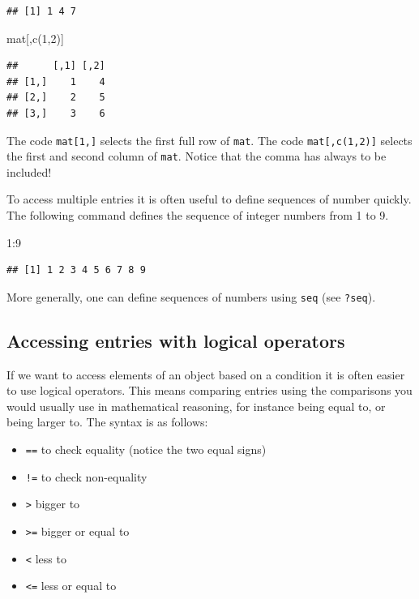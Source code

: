 \documentclass[
]{book}
\newenvironment{Shaded}{\begin{snugshade}}{\end{snugshade}}
\newcommand{\DecValTok}[1]{\textcolor[rgb]{0.00,0.00,0.81}{#1}}
\newcommand{\FunctionTok}[1]{\textcolor[rgb]{0.00,0.00,0.00}{#1}}
\newcommand{\NormalTok}[1]{#1}
\newcommand{\SpecialCharTok}[1]{\textcolor[rgb]{0.00,0.00,0.00}{#1}}
\begin{document}
\begin{verbatim}
## [1] 1 4 7
\end{verbatim}

\begin{Shaded}
\begin{Highlighting}[]
\NormalTok{mat[,}\FunctionTok{c}\NormalTok{(}\DecValTok{1}\NormalTok{,}\DecValTok{2}\NormalTok{)]}
\end{Highlighting}
\end{Shaded}

\begin{verbatim}
##      [,1] [,2]
## [1,]    1    4
## [2,]    2    5
## [3,]    3    6
\end{verbatim}

The code \texttt{mat{[}1,{]}} selects the first full row of \texttt{mat}. The code \texttt{mat{[},c(1,2){]}} selects the first and second column of \texttt{mat}. Notice that the comma has always to be included!

To access multiple entries it is often useful to define sequences of number quickly. The following command defines the sequence of integer numbers from 1 to 9.

\begin{Shaded}
\begin{Highlighting}[]
\DecValTok{1}\SpecialCharTok{:}\DecValTok{9}
\end{Highlighting}
\end{Shaded}

\begin{verbatim}
## [1] 1 2 3 4 5 6 7 8 9
\end{verbatim}

More generally, one can define sequences of numbers using \texttt{seq} (see \texttt{?seq}).

\hypertarget{accessing-entries-with-logical-operators}{%
\subsection{Accessing entries with logical operators}\label{accessing-entries-with-logical-operators}}

If we want to access elements of an object based on a condition it is often easier to use logical operators. This means comparing entries using the comparisons you would usually use in mathematical reasoning, for instance being equal to, or being larger to. The syntax is as follows:

\begin{itemize}
\item
  \texttt{==} to check equality (notice the two equal signs)
\item
  \texttt{!=} to check non-equality
\item
  \texttt{\textgreater{}} bigger to
\item
  \texttt{\textgreater{}=} bigger or equal to
\item
  \texttt{\textless{}} less to
\item
  \texttt{\textless{}=} less or equal to
\end{itemize}
\end{document}
